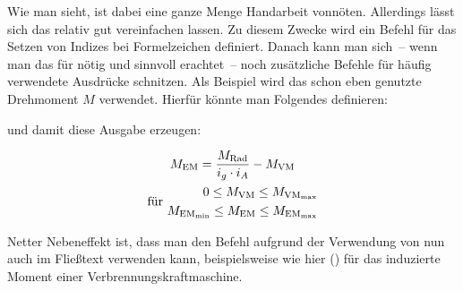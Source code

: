 \documentclass[english,ngerman]{tudscrartcl}
\begin{document}
%
Wie man sieht, ist dabei eine ganze Menge Handarbeit vonnöten. Allerdings lässt 
sich das relativ gut vereinfachen lassen. Zu diesem Zwecke wird ein Befehl 
\PParameter{\dots} für das Setzen von Indizes bei Formelzeichen 
definiert. Danach kann man sich~-- wenn man das für nötig und sinnvoll 
erachtet~-- noch zusätzliche Befehle für häufig verwendete Ausdrücke schnitzen. 
Als Beispiel wird das schon eben genutzte Drehmoment \ensuremath{M} verwendet. 
Hierfür könnte man Folgendes definieren:
%
\CodeHook{\let\newcommand\renewcommand}
\begin{Trunk*}
\newcommand*{\ind}[1]{\ensuremath{_\mathrm{#1}}}
\newcommand*{\M}[1]{\ensuremath{M\ind{#1}}}

\end{Trunk*}
%
und damit diese Ausgabe erzeugen:
%
\begin{Trunk*}
\begin{equation*}
\begin{gathered}
\M{EM} = \frac{\M{Rad}}{i_g \cdot i_A} - \M{VM} \\
\textrm{für }
\begin{aligned}
0\leq \M{VM}\leq \M{VM_{max}} \\ 
\M{EM_{min}}\leq \M{EM}\leq \M{EM_{max}}
\end{aligned}
\end{gathered}
\end{equation*}

\end{Trunk*}
%
Netter Nebeneffekt ist, dass man den Befehl aufgrund der Verwendung von 
\PParameter{\dots} nun auch im Fließtext verwenden kann, 
beispielsweise wie hier  () für 
das induzierte Moment einer Verbrennungskraftmaschine.
\end{document}
